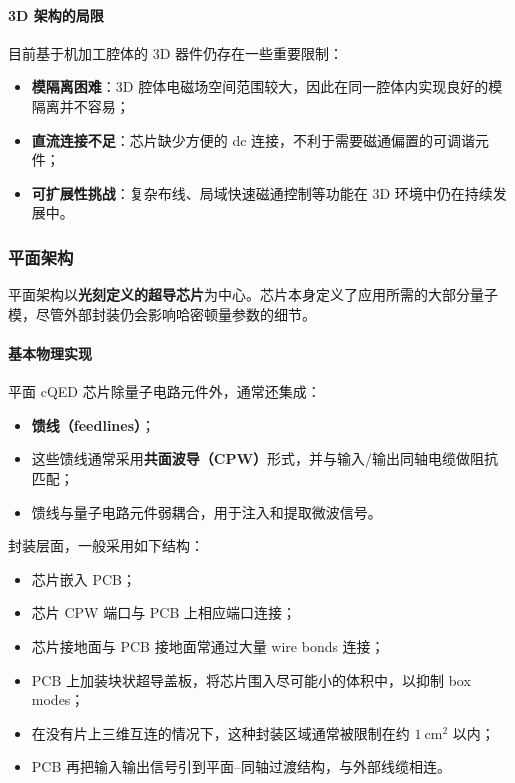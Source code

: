 \documentclass[12pt,a4paper,oneside]{ctexbook}
\begin{document}
\paragraph{3D 架构的局限}
目前基于机加工腔体的 3D 器件仍存在一些重要限制：
\begin{itemize}
    \item \textbf{模隔离困难}：3D 腔体电磁场空间范围较大，因此在同一腔体内实现良好的模隔离并不容易；
    \item \textbf{直流连接不足}：芯片缺少方便的 dc 连接，不利于需要磁通偏置的可调谐元件；
    \item \textbf{可扩展性挑战}：复杂布线、局域快速磁通控制等功能在 3D 环境中仍在持续发展中。
\end{itemize}

\subsubsection{平面架构}

平面架构以\textbf{光刻定义的超导芯片}为中心。芯片本身定义了应用所需的大部分量子模，尽管外部封装仍会影响哈密顿量参数的细节。

\paragraph{基本物理实现}
平面 cQED 芯片除量子电路元件外，通常还集成：
\begin{itemize}
    \item \textbf{馈线（feedlines）}；
    \item 这些馈线通常采用\textbf{共面波导（CPW）}形式，并与输入/输出同轴电缆做阻抗匹配；
    \item 馈线与量子电路元件弱耦合，用于注入和提取微波信号。
\end{itemize}

封装层面，一般采用如下结构：
\begin{itemize}
    \item 芯片嵌入 PCB；
    \item 芯片 CPW 端口与 PCB 上相应端口连接；
    \item 芯片接地面与 PCB 接地面常通过大量 wire bonds 连接；
    \item PCB 上加装块状超导盖板，将芯片围入尽可能小的体积中，以抑制 box modes；
    \item 在没有片上三维互连的情况下，这种封装区域通常被限制在约 \(1~\mathrm{cm}^2\) 以内；
    \item PCB 再把输入输出信号引到平面--同轴过渡结构，与外部线缆相连。
\end{itemize}
\end{document}
